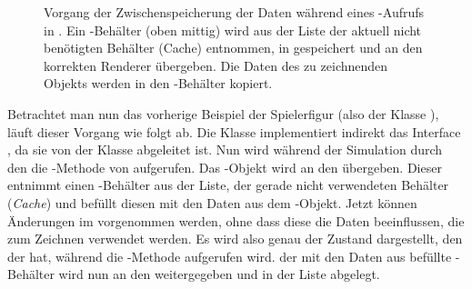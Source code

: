 \begin{figure}
	\centering
		\caption[Vorgang der Zwischenspeicherung der Daten während eines -Aufrufs in .]{Vorgang der Zwischenspeicherung der Daten während eines -Aufrufs in . Ein -Behälter (oben mittig) wird aus der Liste der aktuell nicht benötigten Behälter (Cache) entnommen, in  gespeichert und an den korrekten Renderer übergeben. Die Daten des zu zeichnenden Objekts werden in den -Behälter kopiert.}\label{fig:copyRenderable}
\end{figure}


\begin{leftrule}
	Betrachtet man nun das vorherige Beispiel der Spielerfigur (also der Klasse ), läuft dieser Vorgang wie folgt ab. Die Klasse  implementiert indirekt das Interface , da sie von der Klasse  abgeleitet ist. Nun wird während der Simulation durch den  die -Methode von  aufgerufen. Das -Objekt wird an den  übergeben. Dieser entnimmt einen -Behälter aus der Liste, der gerade nicht verwendeten Behälter (\emph{Cache}) und befüllt diesen mit den Daten aus dem -Objekt. Jetzt können Änderungen im  vorgenommen werden, ohne dass diese die Daten beeinflussen, die zum Zeichnen verwendet werden. Es wird also genau der Zustand dargestellt, den der  hat, während die -Methode aufgerufen wird. der mit den Daten aus  befüllte -Behälter wird nun an den  weitergegeben und in der Liste  abgelegt.
\end{leftrule}

